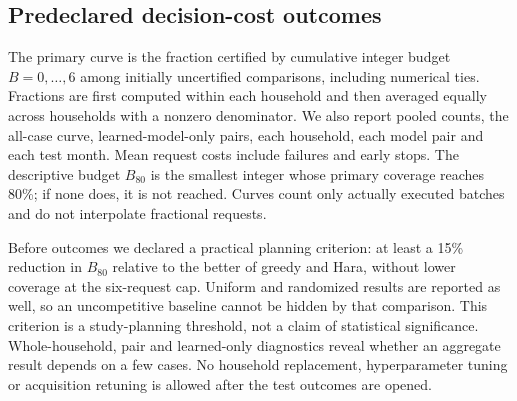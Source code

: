 \subsection{Predeclared decision-cost outcomes}\label{sec:external-metric}
The primary curve is the fraction certified by cumulative integer budget
$B=0,\ldots,6$ among initially uncertified comparisons, including numerical
ties. Fractions are first computed within each household and then averaged
equally across households with a nonzero denominator. We also report pooled
counts, the all-case curve, learned-model-only pairs, each household, each
model pair and each test month. Mean request costs include failures and
early stops. The descriptive budget $B_{80}$ is the smallest integer whose
primary coverage reaches 80\%; if none does, it is not reached. Curves count
only actually executed batches and do not interpolate fractional requests.

Before outcomes we declared a practical planning criterion: at least a
15\% reduction in $B_{80}$ relative to the better of greedy and Hara, without
lower coverage at the six-request cap. Uniform and randomized results are
reported as well, so an uncompetitive baseline cannot be hidden by that
comparison. This criterion is a study-planning threshold, not a claim of
statistical significance. Whole-household,
pair and learned-only diagnostics reveal whether an aggregate result depends
on a few cases. No household replacement, hyperparameter tuning or acquisition
retuning is allowed after the test outcomes are opened.
